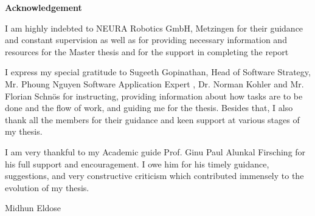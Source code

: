 \documentclass[12pt]{article}
\begin{document}
\newpage
\tableofcontents
\newpage
\listoffigures
{}
\newpage
\listoftables
{}
\newpage
\raggedright
\newpage
\raggedright
{}
\begin{center}
    \textbf{Acknowledgement}
\end{center}
    \raggedright

    I am highly indebted to NEURA Robotics GmbH, Metzingen for their guidance and constant supervision as well as for providing necessary information and resources for the Master thesis and for the support in completing the report

    \vspace{1cm}
    
    I express my special gratitude to Sugeeth Gopinathan, Head of Software Strategy, Mr. Phoung Nguyen Software Application Expert , Dr. Norman Kohler and Mr. Florian Schnös for instructing, providing information about how tasks are to be done and the flow of work, and guiding me for the thesis. Besides that, I also thank all the members for their guidance and keen support at various stages of my thesis.

    \vspace{1cm}

    I am very thankful to my Academic guide Prof. Ginu Paul Alunkal Firsching for his full support and encouragement. I owe him for his timely guidance, suggestions, and very constructive criticism which contributed immensely to the evolution of my thesis.
    
    \vspace{1.5 cm}
    
    \raggedleft
    Midhun Eldose


\newpage
\end{document}
